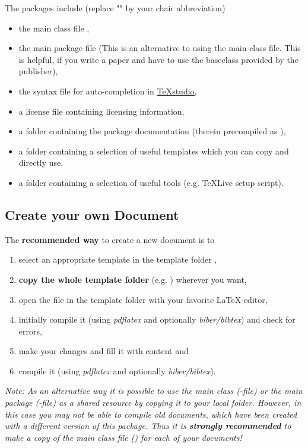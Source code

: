 The packages include (replace "" by your chair abbreviation)

\begin{itemize}
    \item the main class file ,
    \item the main package file 
    (This is an alternative to using the main class file.
    This is helpful, if you write a paper and have to use the baseclass provided by the publisher),
    \item the syntax file  for auto-completion in \underline{\href{http://www.texstudio.org/}{TeXstudio}},
    \item a license file  containing licensing information,
    \item a folder  containing the package documentation (therein precompiled as ),
    \item a folder  containing a selection of useful templates which you can copy and directly use.
    \item a folder  containing a selection of useful tools (e.g. TeXLive setup script).
\end{itemize}


\subsection{Create your own Document}

The \textbf{recommended way} to create a new document is to
\begin{enumerate}
    \item select an appropriate template in the template folder ,
    \item \textbf{copy the whole template folder} (e.g. ) wherever you want,
    \item open the  file in the template folder with your favorite LaTeX-editor,
    \item initially compile it (using \textit{pdflatex} and optionally \textit{biber/bibtex}) and check for errors,
    \item make your changes and fill it with content and
    \item compile it (using \textit{pdflatex} and optionally \textit{biber/bibtex}).
\end{enumerate}

\textit{
    Note: As an alternative way it is possible to use the main class (-file) or the main package (-file) as a shared resource by copying it to your local  folder.
    However, in this case you may not be able to compile old documents, which have been created with a different version of this package.
    Thus it is \textbf{strongly recommended} to make a copy of the main class file () for each of your documents!
}

